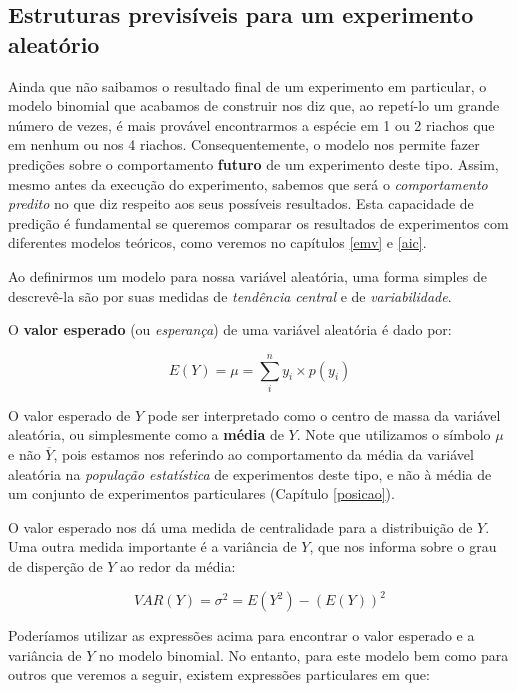 \documentclass[
]{book}
\begin{document}
\hypertarget{estruturas-previsuxedveis-para-um-experimento-aleatuxf3rio}{%
\subsection*{Estruturas previsíveis para um experimento aleatório}\label{estruturas-previsuxedveis-para-um-experimento-aleatuxf3rio}}

Ainda que não saibamos o resultado final de um experimento em particular, o modelo binomial que acabamos de construir nos diz que, ao repetí-lo um grande número de vezes, é mais provável encontrarmos a espécie em 1 ou 2 riachos que em nenhum ou nos 4 riachos. Consequentemente, o modelo nos permite fazer predições sobre o comportamento \textbf{futuro} de um experimento deste tipo. Assim, mesmo antes da execução do experimento, sabemos que será o \emph{comportamento predito} no que diz respeito aos seus possíveis resultados. Esta capacidade de predição é fundamental se queremos comparar os resultados de experimentos com diferentes modelos teóricos, como veremos no capítulos \ref{emv} e \ref{aic}.

Ao definirmos um modelo para nossa variável aleatória, uma forma simples de descrevê-la são por suas medidas de \emph{tendência central} e de \emph{variabilidade}.

O \textbf{valor esperado} (ou \emph{esperança}) de uma variável aleatória é dado por:

\[E(Y) = \mu = \sum_i^n y_i \times p(y_i)\]

O valor esperado de \(Y\) pode ser interpretado como o centro de massa da variável aleatória, ou simplesmente como a \textbf{média} de \(Y\). Note que utilizamos o símbolo \(\mu\) e não \(\overline{Y}\), pois estamos nos referindo ao comportamento da média da variável aleatória na \emph{população estatística} de experimentos deste tipo, e não à média de um conjunto de experimentos particulares (Capítulo \ref{posicao}).

O valor esperado nos dá uma medida de centralidade para a distribuição de \(Y\). Uma outra medida importante é a variância de \(Y\), que nos informa sobre o grau de disperção de \(Y\) ao redor da média:

\[VAR(Y) = \sigma^2 = E(Y^2) - (E(Y))^2\]

Poderíamos utilizar as expressões acima para encontrar o valor esperado e a variância de \(Y\) no modelo binomial. No entanto, para este modelo bem como para outros que veremos a seguir, existem expressões particulares em que:
\end{document}
